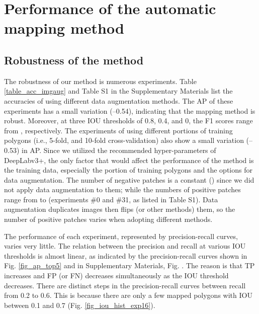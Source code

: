 \documentclass[authoryear,preprint,review,12pt]{elsarticle}
\begin{document}
\section{Performance of the automatic mapping method}
\label{sec_performance}

\subsection{Robustness of the method}
\label{subsec_robustness}

The robustness of our method is  numerous experiments. Table \ref{table_acc_imgaug} and Table S1 in the Supplementary Materials list the accuracies of using different data augmentation methods. The AP of these experiments has a small variation (--0.54), indicating that the mapping method is robust. Moreover, at three IOU thresholds of 0.8, 0.4, and 0, the F1 scores range from , respectively. The experiments of using different portions of training polygons (i.e., 5-fold, and 10-fold cross-validation) also show a small variation (--0.53) in AP. Since we utilized the recommended hyper-parameters of DeepLabv3+, the only factor that would affect the performance of the method is the training data, especially the portion of training polygons and the options for data augmentation. The number of negative patches is a constant () since we did not apply data augmentation to them; while the numbers of positive patches range from  to  (experiments \#0 and \#31, as listed in Table  S1). Data augmentation duplicates images then flips (or other methods) them, so the number of positive patches varies when adopting different methods.

The performance of each experiment, represented by precision-recall curves, varies very little. The relation between the precision and recall at various IOU thresholds is almost linear, as indicated by the precision-recall curves shown in Fig. \ref{fig_ap_top5} and  in Supplementary Materials, Fig. . The reason is that TP increases and FP (or FN) decreases simultaneously as the IOU threshold decreases. There are distinct steps in the precision-recall curves between recall from 0.2 to 0.6. This is because there are only a few mapped polygons with IOU between 0.1 and 0.7 (Fig. \ref{fig_iou_hist_exp16}).
\end{document}
